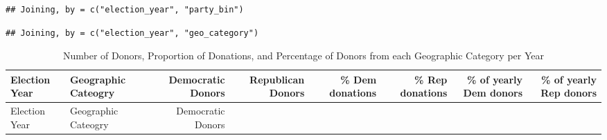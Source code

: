 \documentclass[10pt,]{article}
\begin{document}
\begin{verbatim}
## Joining, by = c("election_year", "party_bin")
\end{verbatim}

\begin{verbatim}
## Joining, by = c("election_year", "geo_category")
\end{verbatim}

\begin{longtable}[]{@{}llrrrrrr@{}}
\caption{Number of Donors, Proportion of Donations, and Percentage of
Donors from each Geographic Category per Year}\tabularnewline
\toprule
\begin{minipage}[b]{0.07\columnwidth}\raggedright
Election Year\strut
\end{minipage} & \begin{minipage}[b]{0.12\columnwidth}\raggedright
Geographic Cateogry\strut
\end{minipage} & \begin{minipage}[b]{0.09\columnwidth}\raggedleft
Democratic Donors\strut
\end{minipage} & \begin{minipage}[b]{0.09\columnwidth}\raggedleft
Republican Donors\strut
\end{minipage} & \begin{minipage}[b]{0.08\columnwidth}\raggedleft
\% Dem donations\strut
\end{minipage} & \begin{minipage}[b]{0.08\columnwidth}\raggedleft
\% Rep donations\strut
\end{minipage} & \begin{minipage}[b]{0.12\columnwidth}\raggedleft
\% of yearly Dem donors\strut
\end{minipage} & \begin{minipage}[b]{0.12\columnwidth}\raggedleft
\% of yearly Rep donors\strut
\end{minipage}\tabularnewline
\midrule
\endfirsthead
\toprule
\begin{minipage}[b]{0.07\columnwidth}\raggedright
Election Year\strut
\end{minipage} & \begin{minipage}[b]{0.12\columnwidth}\raggedright
Geographic Cateogry\strut
\end{minipage} & \begin{minipage}[b]{0.09\columnwidth}\raggedleft
Democratic Donors\strut
\end{minipage} & \begin{minipage}[b]{0.09\columnwidth}\raggedleft

\end{minipage}
\end{longtable}
\end{document}
